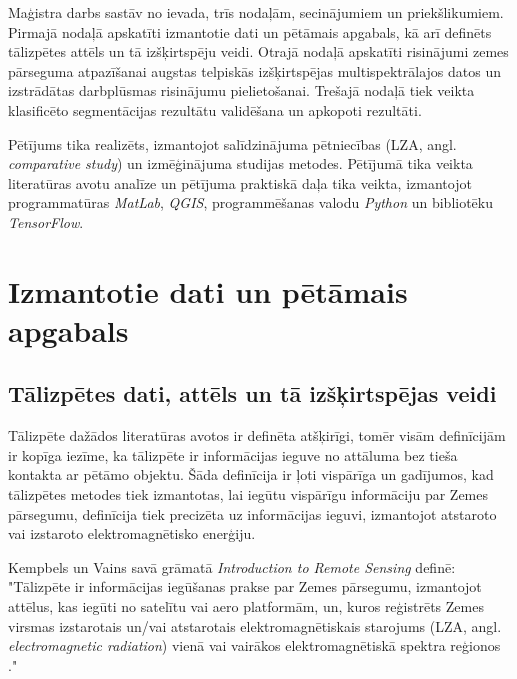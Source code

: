 \documentclass[12pt,paper=a4]{report}
\begin{document}
Maģistra darbs sastāv no ievada, trīs nodaļām, secinājumiem un priekšlikumiem. Pirmajā nodaļā apskatīti izmantotie dati un pētāmais apgabals, kā arī definēts tālizpētes attēls un tā izšķirtspēju veidi. Otrajā nodaļā apskatīti risinājumi zemes pārseguma atpazīšanai augstas telpiskās izšķirtspējas multispektrālajos datos un izstrādātas darbplūsmas risinājumu pielietošanai. Trešajā nodaļā tiek veikta klasificēto segmentācijas rezultātu validēšana un apkopoti rezultāti.\par
Pētījums tika realizēts, izmantojot salīdzinājuma pētniecības (LZA, angl. \textit{comparative study}) un izmēģinājuma studijas metodes. Pētījumā tika veikta literatūras avotu analīze un pētījuma praktiskā daļa tika veikta, izmantojot programmatūras \textit{MatLab}, \textit{QGIS}, programmēšanas valodu \textit{Python} un bibliotēku \textit{TensorFlow}.

\chapter{Izmantotie dati un pētāmais apgabals}
\section{Tālizpētes dati, attēls un tā izšķirtspējas veidi}Tālizpēte dažādos literatūras avotos ir definēta atšķirīgi, tomēr visām definīcijām ir kopīga iezīme, ka tālizpēte ir informācijas ieguve no attāluma bez tieša kontakta ar pētāmo objektu. Šāda definīcija ir ļoti vispārīga un gadījumos, kad tālizpētes metodes tiek izmantotas, lai iegūtu vispārīgu informāciju par Zemes pārsegumu, definīcija tiek precizēta uz informācijas ieguvi, izmantojot atstaroto vai izstaroto elektromagnētisko enerģiju.\par
Kempbels un Vains savā grāmatā \textit{Introduction to Remote Sensing} definē: "Tālizpēte ir informācijas iegūšanas prakse par Zemes pārsegumu, izmantojot attēlus, kas iegūti no satelītu vai aero platformām, un, kuros reģistrēts Zemes virsmas izstarotais un/vai atstarotais elektromagnētiskais starojums (LZA, angl. \textit{electromagnetic radiation}) vienā vai vairākos elektromagnētiskā spektra reģionos \cite{IntrToRemSensing}."\par
\end{document}
